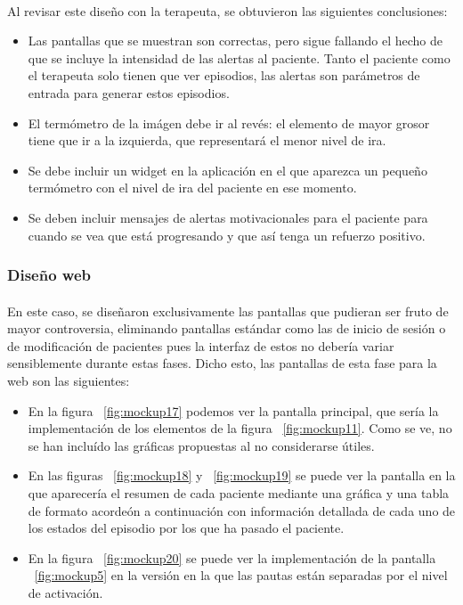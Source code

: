 \paragraph{}
Al revisar este diseño con la terapeuta, se obtuvieron las siguientes conclusiones:

\begin{itemize}
    \item Las pantallas que se muestran son correctas, pero sigue fallando el hecho de que se incluye la intensidad de las alertas al paciente. Tanto el paciente como el terapeuta solo tienen que ver episodios, las alertas son parámetros de entrada para generar estos episodios.
    \item El termómetro de la imágen debe ir al revés: el elemento de mayor grosor tiene que ir a la izquierda, que representará el menor nivel de ira.
    \item Se debe incluir un widget en la aplicación en el que aparezca un pequeño termómetro con el nivel de ira del paciente en ese momento.
    \item Se deben incluir mensajes de alertas motivacionales para el paciente para cuando se vea que está progresando y que así tenga un refuerzo positivo.
\end{itemize}

\subsubsection{Diseño web}
\paragraph{}
En este caso, se diseñaron exclusivamente las pantallas que pudieran ser fruto de mayor controversia, eliminando pantallas estándar como las de inicio de sesión o de modificación de pacientes pues la interfaz de estos no debería variar sensiblemente durante estas fases. Dicho esto, las pantallas de esta fase para la web son las siguientes:
\begin{itemize}
    \item En la figura ~\ref{fig:mockup17} podemos ver la pantalla principal, que sería la implementación de los elementos de la figura ~\ref{fig:mockup11}. Como se ve, no se han incluído las gráficas propuestas al no considerarse útiles.
    \item En las figuras ~\ref{fig:mockup18} y ~\ref{fig:mockup19} se puede ver la pantalla en la que aparecería el resumen de cada paciente mediante una gráfica y una tabla de formato acordeón a continuación con información detallada de cada uno de los estados del episodio por los que ha pasado el paciente.
    \item En la figura ~\ref{fig:mockup20} se puede ver la implementación de la pantalla ~\ref{fig:mockup5} en la versión en la que las pautas están separadas por el nivel de activación.
\end{itemize}

